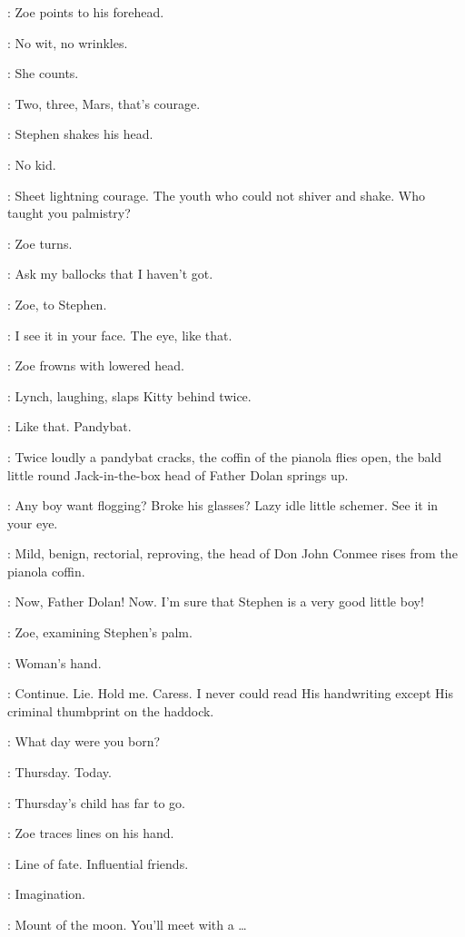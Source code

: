 :
Zoe points to his forehead.

\Zoe:
No wit, no wrinkles.

:
She counts.

\Zoe:
Two, three, Mars, that's courage.

:
Stephen shakes his head.

\Zoe:
No kid.

\Lynch:
Sheet lightning courage.
The youth who could not shiver and shake.
Who taught you palmistry?

:
Zoe turns.

\Zoe:
Ask my ballocks that I haven't got.

:
Zoe, to Stephen.

\Zoe:
I see it in your face.
The eye, like that.

:
Zoe frowns with lowered head.

:
Lynch, laughing, slaps Kitty behind twice.

\Lynch:
Like that.
Pandybat.

:
Twice loudly a pandybat cracks, the coffin of the pianola flies open,
the bald little round Jack-in-the-box head of Father Dolan springs up.

\FatherDolan:
Any boy want flogging?
Broke his glasses?
Lazy idle little schemer.
See it in your eye.

:
Mild, benign, rectorial, reproving, the head of Don John Conmee
rises from the pianola coffin.

\DonJohnConmee:
Now, Father Dolan!
Now.
I'm sure that Stephen is a very good little boy!

:
Zoe, examining Stephen's palm.

\Zoe:
Woman's hand.

\Stephen:
Continue.
Lie.
Hold me. Caress.
I never could read His handwriting except His criminal thumbprint on the haddock.

\Zoe:
What day were you born?

\Stephen:
Thursday.
Today.

\Zoe:
Thursday's child has far to go.

:
Zoe traces lines on his hand.

\Zoe:
Line of fate.
Influential friends.

\Florry:
Imagination.

\Zoe:
Mount of the moon.
You'll meet with a \ldots

